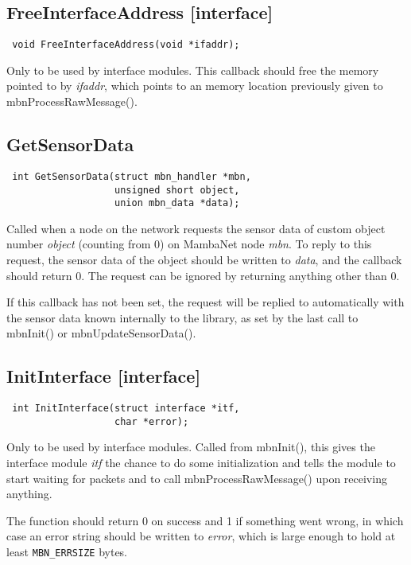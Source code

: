 \documentclass[a4paper]{report}
\begin{document}
\subsection{FreeInterfaceAddress \footnotesize{[interface]}}
\begin{verbatim}
 void FreeInterfaceAddress(void *ifaddr);
\end{verbatim}
Only to be used by interface modules. This callback should free the memory pointed to by \textit{ifaddr}, which points to an memory location previously given to mbnProcessRawMessage().


\subsection{GetSensorData}
\begin{verbatim}
 int GetSensorData(struct mbn_handler *mbn,
                   unsigned short object,
                   union mbn_data *data);
\end{verbatim}
Called when a node on the network requests the sensor data of custom object number \textit{object} (counting from 0) on MambaNet node \textit{mbn}. To reply to this request, the sensor data of the object should be written to \textit{data}, and the callback should return 0. The request can be ignored by returning anything other than 0.

If this callback has not been set, the request will be replied to automatically with the sensor data known internally to the library, as set by the last call to mbnInit() or mbnUpdateSensorData().


\subsection{InitInterface \footnotesize{[interface]}}
\begin{verbatim}
 int InitInterface(struct interface *itf,
                   char *error);
\end{verbatim}
Only to be used by interface modules. Called from mbnInit(), this gives the interface module \textit{itf} the chance to do some initialization and tells the module to start waiting for packets and to call mbnProcessRawMessage() upon receiving anything.

The function should return 0 on success and 1 if something went wrong, in which case an error string should be written to \textit{error}, which is large enough to hold at least \verb|MBN_ERRSIZE| bytes.
\end{document}
